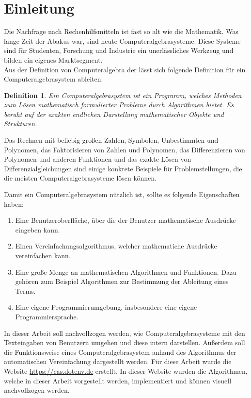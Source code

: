 \documentclass[11pt]{article}
\newtheorem{defin}{Definition}
\begin{document}
\section{Einleitung}

Die Nachfrage nach Rechenhilfsmitteln ist fast so alt wie die Mathematik.
Was lange Zeit der Abakus war, sind heute Computeralgebrasysteme.
Diese Systeme sind für Studenten, Forschung und Industrie ein unerlässliches Werkzeug
und bilden ein eigenes Marktsegment.\\

Aus der Definition von Computeralgebra der \citeauthor{CA} \cite{CA}
lässt sich folgende Definition für ein Computeralgebrasystem ableiten:
\begin{defin}
\label{def:cas}
Ein Computeralgebrasystem ist ein Programm, welches Methoden zum Lösen mathematisch
formulierter Probleme durch Algorithmen bietet. Es beruht auf der exakten
endlichen Darstellung mathematischer Objekte und Strukturen.
\end{defin}
Das Rechnen mit beliebig großen Zahlen, Symbolen, Unbestimmten und Polynomen, 
das Faktorisieren von Zahlen und Polynomen, das Differenzieren von Polynomen und 
anderen Funktionen und das exakte Lösen von Differenzialgleichungen 
sind einige konkrete Beispiele für Problemstellungen, die die meisten Computeralgebrasysteme
lösen können.

Damit ein Computeralgebrasystem nützlich ist, sollte es folgende Eigenschaften haben:
\begin{enumerate}
  \item Eine Benutzeroberfläche, über die der Benutzer mathematische Ausdrücke eingeben kann.
  \item Einen Vereinfachungsalgorithmus, welcher mathematiche Ausdrücke vereinfachen kann.
  \item Eine große Menge an mathematischen Algorithmen und Funktionen. Dazu gehören zum Beispiel
        Algorithmen zur Bestimmung der Ableitung eines Terms.
  \item Eine eigene Programmierumgebung, insbesondere eine eigene Programmiersprache.
\end{enumerate}

In dieser Arbeit soll nachvollzogen werden, wie Computeralgebrasysteme mit den Texteingaben von Benutzern 
umgehen und diese intern darstellen. Außerdem soll die Funktionsweise eines Computeralgebrasystem 
anhand des Algorithmus der automatischen Vereinfachung dargestellt werden.
Für diese Arbeit wurde die Website \url{https://cas.dotenv.de} erstellt.
In dieser Website wurden die Algorithmen, welche in dieser Arbeit vorgestellt werden, implementiert
und können visuell nachvollzogen werden.
\end{document}
